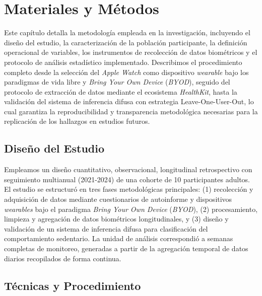\chapter{Materiales y Métodos}
\label{chap:materiales_metodos}

\noindent Este capítulo detalla la metodología empleada en la investigación, incluyendo el diseño del estudio, la caracterización de la población participante, la definición operacional de variables, los instrumentos de recolección de datos biométricos y el protocolo de análisis estadístico implementado. Describimos el procedimiento completo desde la selección del \textit{Apple Watch} como dispositivo \textit{wearable} bajo los paradigmas de vida libre y \textit{Bring Your Own Device} (\textit{BYOD}), seguido del protocolo de extracción de datos mediante el ecosistema \textit{HealthKit}, hasta la validación del sistema de inferencia difusa con estrategia Leave-One-User-Out, lo cual garantiza la reproducibilidad y transparencia metodológica necesarias para la replicación de los hallazgos en estudios futuros.

\section{Diseño del Estudio}
\label{sec:diseno}

Empleamos un diseño cuantitativo, observacional, longitudinal retrospectivo con seguimiento multianual (2021-2024) de una cohorte de 10 participantes adultos. El estudio se estructuró en tres fases metodológicas principales: (1) recolección y adquisición de datos mediante cuestionarios de autoinforme y dispositivos \textit{wearables} bajo el paradigma \textit{Bring Your Own Device} (\textit{BYOD}), (2) procesamiento, limpieza y agregación de datos biométricos longitudinales, y (3) diseño y validación de un sistema de inferencia difusa para clasificación del comportamiento sedentario. La unidad de análisis correspondió a semanas completas de monitoreo, generadas a partir de la agregación temporal de datos diarios recopilados de forma continua.

\section{Técnicas y Procedimiento}
\label{sec:tecnicas_procedimiento}

